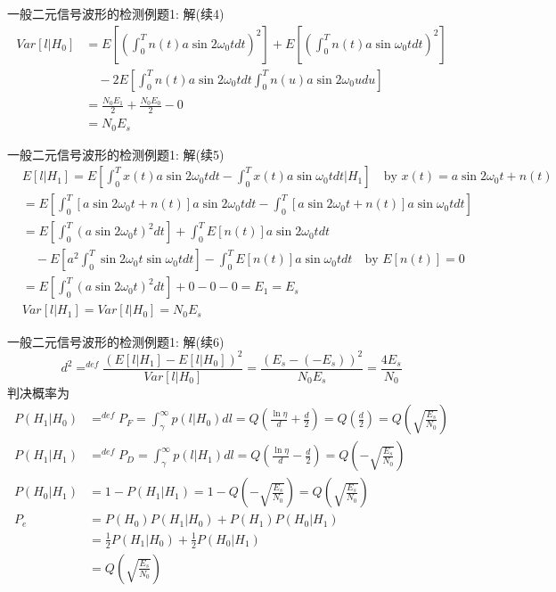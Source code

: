 \begin{frame}[shrink]{一般二元信号波形的检测例题1: 解(续4)}
\begin{align*}
Var[l|H_0]&=E\left[\left(\int_{0}^{T}n(t)a\sin2\omega_0tdt\right)^2\right]+E\left[\left(\int_{0}^{T}n(t)a\sin\omega_0tdt\right)^2\right]\\
&\quad -2E\left[\int_{0}^{T}n(t)a\sin2\omega_0tdt\int_{0}^{T}n(u)a\sin2\omega_0udu\right]\\
&=\frac{N_0E_1}{2}+\frac{N_0E_0}{2}-0\\
&=N_0E_s
\end{align*}
\end{frame}

\begin{frame}[shrink]{一般二元信号波形的检测例题1: 解(续5)}
\begin{align*}
&E[l|H_1]=E\left[\int_{0}^{T}x(t)a\sin2\omega_0tdt-\int_{0}^{T}x(t)a\sin\omega_0tdt|H_1\right]\quad \text{by } x(t)=a\sin2\omega_0t+n(t)\\
&=E\left[\int_{0}^{T}[a\sin2\omega_0t+n(t)]a\sin2\omega_0tdt-\int_{0}^{T}[a\sin2\omega_0t+n(t)]a\sin\omega_0tdt\right]\\
&=E\left[\int_{0}^{T}(a\sin2\omega_0t)^2dt\right]+\int_{0}^{T}E[n(t)]a\sin2\omega_0tdt\\
&\quad -E\left[a^2\int_{0}^{T}\sin2\omega_0t\sin\omega_0tdt\right]-\int_{0}^{T}E[n(t)]a\sin\omega_0tdt\quad\text{by }E[n(t)]=0\\
&=E\left[\int_{0}^{T}(a\sin2\omega_0t)^2dt\right]+0-0-0=E_1=E_s\\
&Var[l|H_1]=Var[l|H_0]=N_0E_s
\end{align*}
\end{frame}

\begin{frame}[shrink]{一般二元信号波形的检测例题1: 解(续6)}
\[
d^2\mathop{=}^{def}\frac{\left(E[l|H_1]-E[l|H_0]\right)^2}{Var[l|H_0]}=\frac{\left(E_s-(-E_s)\right)^2}{N_0E_s}=\frac{4E_s}{N_0}
\]
判决概率为
\begin{align*}
P(H_1|H_0)&\mathop{=}^{def}P_F=\int_{\gamma}^{\infty}p(l|H_0)dl=Q\left(\frac{\ln\eta}{d}+\frac{d}{2}\right)=Q\left(\frac{d}{2}\right)=Q\left(\sqrt{\frac{E_s}{N_0}}\right)\\
P(H_1|H_1)&\mathop{=}^{def}P_D=\int_{\gamma}^{\infty}p(l|H_1)dl=Q\left(\frac{\ln\eta}{d}-\frac{d}{2}\right)=Q\left(-\sqrt{\frac{E_s}{N_0}}\right)\\
P(H_0|H_1)&=1-P(H_1|H_1)=1-Q\left(-\sqrt{\frac{E_s}{N_0}}\right)=Q\left(\sqrt{\frac{E_s}{N_0}}\right)\\
P_e&=P(H_0)P(H_1|H_0)+P(H_1)P(H_0|H_1)\\
&=\frac{1}{2}P(H_1|H_0)+\frac{1}{2}P(H_0|H_1)\\
&=Q\left(\sqrt{\frac{E_s}{N_0}}\right)
\end{align*}
\end{frame}

